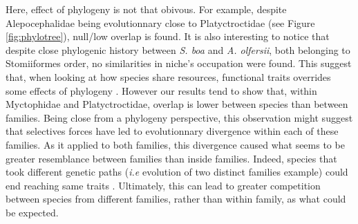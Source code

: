 Here, effect of phylogeny is not that obivous. For example, despite Alepocephalidae being evolutionnary close to Platyctroctidae (see Figure \ref{fig:phylotree}), null/low overlap is found. It is also interesting to notice that despite close phylogenic history between \textit{S. boa} and \textit{A. olfersii}, both belonging to Stomiiformes order, no similarities in niche's occupation were found. This suggest that, when looking at how species share resources, functional traits overrides some effects of phylogeny \citep{kremer2017}. However our results tend to show that, within Myctophidae and Platyctroctidae, overlap is lower between species than between families. Being close from a phylogeny perspective, this observation might suggest that selectives forces have led to evolutionnary divergence within each of these families. As it applied to both families, this divergence caused what seems to be greater resemblance between families than inside families. Indeed, species that took different genetic paths (\textit{i.e} evolution of two distinct families example) could end reaching same traits \citep{natarajan2016}. Ultimately, this can lead to greater competition between species from different families, rather than within family, as what could be expected.







